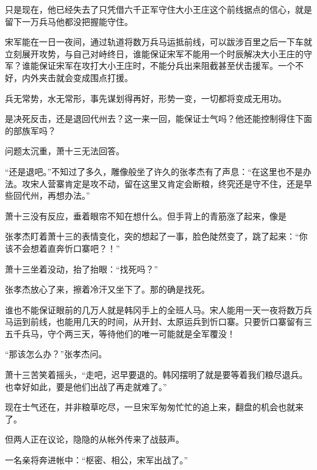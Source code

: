 只是现在，他已经失去了只凭借六千正军守住大小王庄这个前线据点的信心，就是留下一万兵马他都没把握能守住。

宋军能在一日一夜间，通过轨道将数万兵马运抵前线，可以跋涉百里之后一下车就立刻展开攻势，与自己对峙终日，谁能保证宋军不能用一个时辰解决大小王庄的守军？谁能保证宋军在攻打大小王庄时，不能分兵出来阻截甚至伏击援军。一个不好，内外夹击就会变成围点打援。

兵无常势，水无常形，事先谋划得再好，形势一变，一切都将变成无用功。

是决死反击，还是退回代州去？这一来一回，能保证士气吗？他还能控制得住下面的部族军吗？

问题太沉重，萧十三无法回答。

“还是退吧。”不知过了多久，雕像般坐了许久的张孝杰有了声息：“在这里也不是办法。攻宋人营寨肯定是攻不动，留在这里又肯定会断粮，终究还是守不住，还是早些回代州，再想办法。”

萧十三没有反应，垂着眼帘不知在想什么。但手背上的青筋涨了起来，像是

张孝杰盯着萧十三的表情变化，突的想起了一事，脸色陡然变了，跳了起来：“你该不会想着直奔忻口寨吧？！”

萧十三坐着没动，抬了抬眼：“找死吗？”

张孝杰放心了来，擦着冷汗又坐下了。那的确是找死。

谁也不能保证眼前的几万人就是韩冈手上的全班人马。宋人能用一天一夜将数万兵马运到前线，也能用几天的时间，从开封、太原运兵到忻口寨。只要忻口寨留有三五千兵马，守个两三天，等待他们的唯一可能就是全军覆没！

“那该怎么办？”张孝杰问。

萧十三苦笑着摇头，“走吧，迟早要退的。韩冈摆明了就是要等着我们粮尽退兵。也幸好如此，要是他们出战了再走就难了。”

现在士气还在，并非粮草吃尽，一旦宋军匆匆忙忙的追上来，翻盘的机会也就来了。

但两人正在议论，隐隐的从帐外传来了战鼓声。

一名亲将奔进帐中：“枢密、相公，宋军出战了。”
